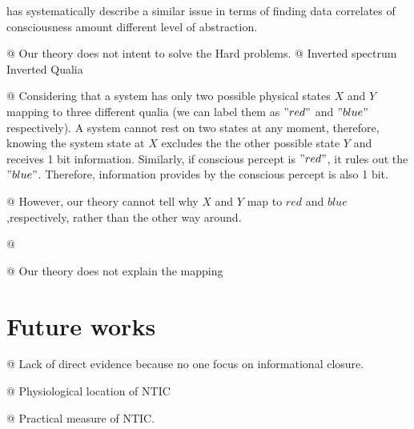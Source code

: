 \documentclass[utf8]{article}
\newenvironment{ants}
			{
			 \begin{easylist}[itemize]
		 	}
			{
			\end{easylist}
			} %
\begin{document}
    \cite{Gamez2016} has systematically describe a similar issue in terms of finding data correlates of consciousness amount different 
    level of abstraction. 
    
    
        \begin{ants}
            @ Our theory does not intent to solve the Hard problems. 
            @ Inverted spectrum Inverted Qualia \citep{Shoemaker1982-SHOTIS, Block1990-BLOIE, Locke1979-LOCTCE-2}
            
            @ Considering that a system has only two possible physical states $X$ and $Y$ mapping to three different qualia (we can label them as $"red"$ and $"blue"$ respectively). A system cannot rest on two states at any moment, therefore, knowing the system state at $X$ excludes the the other possible state $Y$ and receives 1 bit information. Similarly, if conscious percept is $"red"$, it rules out the $"blue"$. Therefore, information provides by the conscious percept is also 1 bit. 
            
            @ However, our theory cannot tell why $X$ and $Y$ map to $red$ and $blue$ ,respectively, rather than the other way around. 
            
            @ 
            
            
            @ Our theory does not explain the mapping
        \end{ants}
    
    
	\section{Future works}
		\begin{ants}

			@ Lack of direct evidence because no one focus on informational closure.
			
			@ Physiological location of NTIC
			
			@ Practical measure of NTIC. 

		\end{ants}
\end{document}
